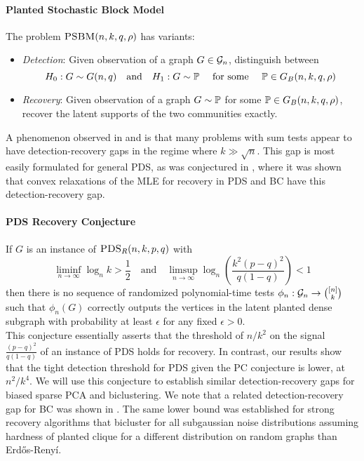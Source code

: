 \documentclass[11pt]{article}
\begin{document}
\paragraph{Planted Stochastic Block Model} The problem $\textsc{PSBM}(n, k, q, \rho)$ has variants:
\begin{itemize}
\item \emph{Detection}: Given observation of a graph $G \in \mathcal{G}_n$, distinguish between
$$H_0: G \sim G(n, q) \quad \text{and} \quad H_1 : G \sim \mathbb{P} \quad \text{ for some } \quad \mathbb{P} \in G_B(n, k, q, \rho)$$
\item \emph{Recovery}: Given observation of a graph $G \sim \mathbb{P}$ for some $\mathbb{P} \in G_B(n, k, q, \rho)$, recover the latent supports of the two communities exactly.
\end{itemize}

A phenomenon observed in \cite{cai2015computational} and \cite{hajek2015computational} is that many problems with sum tests appear to have detection-recovery gaps in the regime where $k \gg \sqrt{n}$. This gap is most easily formulated for general PDS, as was conjectured in \cite{chen2016statistical}, where it was shown that convex relaxations of the MLE for recovery in PDS and BC have this detection-recovery gap.

\paragraph{PDS Recovery Conjecture} If $G$ is an instance of $\textsc{PDS}_R(n, k, p, q)$ with
$$\liminf_{n \to \infty} \log_n k > \frac{1}{2} \quad \text{and} \quad \limsup_{n \to \infty} \log_n \left(\frac{k^2(p-q)^2}{q(1-q)} \right) < 1$$
then there is no sequence of randomized polynomial-time tests $\phi_n : \mathcal{G}_n \to \binom{[n]}{k}$ such that $\phi_n(G)$ correctly outputs the vertices in the latent planted dense subgraph with probability at least $\epsilon$ for any fixed $\epsilon > 0$. \\

This conjecture essentially asserts that the threshold of $n/k^2$ on the signal $\frac{(p-q)^2}{q(1 - q)}$ of an instance of PDS holds for recovery. In contrast, our results show that the tight detection threshold for PDS given the PC conjecture is lower, at $n^2/k^4$. We will use this conjecture to establish similar detection-recovery gaps for biased sparse PCA and biclustering. We note that a related detection-recovery gap for BC was shown in \cite{cai2015computational}. The same lower bound was established for strong recovery algorithms that bicluster for all subgaussian noise distributions assuming hardness of planted clique for a different distribution on random graphs than Erd\H{o}s-Reny\'{i}.
\end{document}
